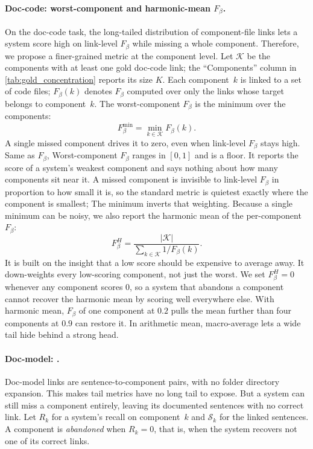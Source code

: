 \paragraph{Doc-code: worst-component and harmonic-mean \texorpdfstring{$F_\beta$}{F-beta}.}
On the doc-code task, the long-tailed distribution of component-file links lets a system score high on link-level $F_\beta$ while missing a whole component. %
Therefore, we propose a finer-grained metric at the component level.
Let $\mathcal{K}$ be the components with at least one gold doc-code link; the
``Components'' column in \autoref{tab:gold_concentration} reports its size $K$.
Each component~$k$ is linked to a set of code files; 
$F_\beta(k)$ denotes $F_\beta$ computed over only the links whose target belongs to component~$k$.
The worst-component $F_\beta$ is the minimum over the components:
\begin{equation}
F_\beta^{\min} = \min_{k \in \mathcal{K}} F_\beta(k).
\label{eq:worst}
\end{equation}
A single missed component drives it to zero, even when link-level $F_\beta$ stays high.
Same as $F_\beta$, Worst-component $F_\beta$ ranges in $[0,1]$ and is a floor.
It reports the score of a system's weakest component and says nothing about how many components sit near it.
A missed component is invisible to link-level $F_\beta$ in proportion to how small it is, so the standard metric is quietest exactly where the component is smallest; 
The minimum inverts that weighting.
Because a single minimum can be noisy, we also report the harmonic mean of the per-component $F_\beta$:
\begin{equation}
F_\beta^{H} = \frac{|\mathcal{K}|}{\sum_{k \in \mathcal{K}} 1/F_\beta(k)}.
\label{eq:harm}
\end{equation}
It is built on the insight that a low score should be expensive to average away.
It down-weights every low-scoring component, not just the worst.
We set $F_\beta^{H} = 0$ whenever any component scores $0$, so a system that abandons a component cannot recover the harmonic mean by scoring well everywhere else.
With harmonic mean, $F_\beta$ of one component at $0.2$ pulls the mean further than four components at $0.9$ can restore it.
In arithmetic mean, macro-average lets a wide tail hide behind a strong head.

\paragraph{Doc-model: \cmrname.}
Doc-model links are sentence-to-component pairs, with no folder directory expansion.
This makes tail metrics have no long tail to expose.
But a system can still miss a component entirely, leaving its documented sentences with no correct link.
Let $R_k$ for a system's recall on component~$k$ and $\mathcal{S}_k$ for the linked sentences.
A component is \emph{abandoned} when $R_k = 0$, that is, when the system recovers not one of its correct links.

